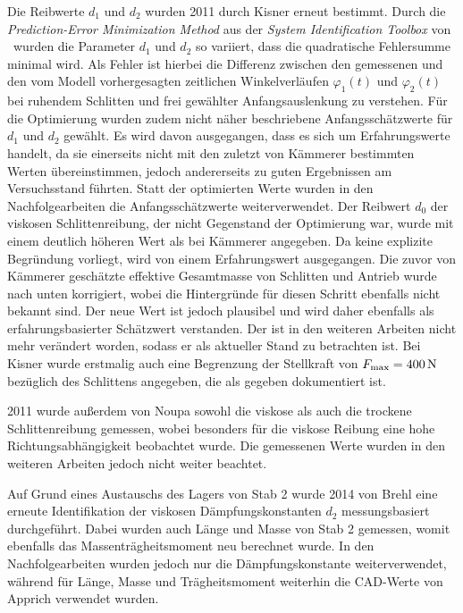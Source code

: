 Die Reibwerte $d_1$ und $d_2$ wurden 2011 durch Kisner \cite{kisner} erneut bestimmt. Durch die \textit{Prediction-Error Minimization Method} aus der \textit{System Identification Toolbox} von \Matlab\ wurden die Parameter $d_1$ und $d_2$ so variiert, dass die quadratische Fehlersumme minimal wird. Als Fehler ist hierbei die Differenz zwischen den gemessenen und den vom Modell vorhergesagten zeitlichen Winkelverläufen $\varphi_1(t)$ und $\varphi_2(t)$ bei ruhendem Schlitten und frei gewählter Anfangsauslenkung zu verstehen. Für die Optimierung wurden zudem nicht näher beschriebene Anfangsschätzwerte für $d_1$ und $d_2$ gewählt. Es wird davon ausgegangen, dass es sich um Erfahrungswerte handelt, da sie einerseits nicht mit den zuletzt von Kämmerer \cite{kämmerer} bestimmten Werten übereinstimmen, jedoch andererseits zu guten Ergebnissen am Versuchsstand führten. Statt der optimierten Werte wurden in den Nachfolgearbeiten die Anfangsschätzwerte weiterverwendet. Der Reibwert $d_0$ der viskosen Schlittenreibung, der nicht Gegenstand der Optimierung war, wurde mit einem deutlich höheren Wert als bei Kämmerer \cite{kämmerer} angegeben. Da keine explizite Begründung vorliegt, wird von einem Erfahrungswert ausgegangen. Die zuvor von Kämmerer \cite{kämmerer} geschätzte effektive Gesamtmasse von Schlitten und Antrieb wurde nach unten korrigiert, wobei die Hintergründe für diesen Schritt ebenfalls nicht bekannt sind. Der neue Wert ist jedoch plausibel und wird daher ebenfalls als erfahrungsbasierter Schätzwert verstanden. Der ist in den weiteren Arbeiten nicht mehr verändert worden, sodass er als aktueller Stand zu betrachten ist. Bei Kisner \cite{kisner} wurde erstmalig auch eine Begrenzung der Stellkraft von $F_{\mathrm{max}}=400\,\mathrm{N}$ bezüglich des Schlittens angegeben, die als gegeben dokumentiert ist. 

2011 wurde außerdem von Noupa \cite{noupa} sowohl die viskose als auch die trockene Schlittenreibung gemessen, wobei besonders für die viskose Reibung eine hohe Richtungsabhängigkeit beobachtet wurde. Die gemessenen Werte wurden in den weiteren Arbeiten jedoch nicht weiter beachtet.

Auf Grund eines Austauschs des Lagers von Stab 2 wurde 2014 von Brehl \cite{brehl} eine erneute Identifikation der viskosen Dämpfungskonstanten $d_2$ messungsbasiert durchgeführt. Dabei wurden auch Länge und Masse von Stab 2 gemessen, womit ebenfalls das Massenträgheitsmoment neu berechnet wurde. In den Nachfolgearbeiten wurden jedoch nur die Dämpfungskonstante weiterverwendet, während für Länge, Masse und Trägheitsmoment weiterhin die CAD-Werte von Apprich \cite{apprich} verwendet wurden.  

